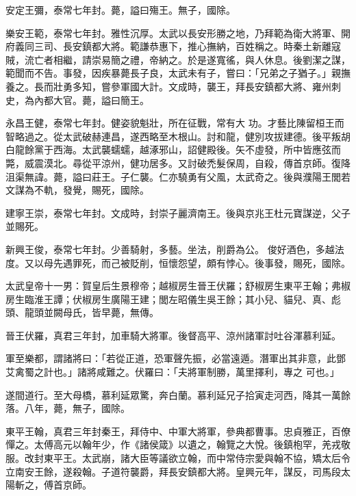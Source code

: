 \begin{pinyinscope}
 安定王彌，泰常七年封。薨，謚曰殤王。無子，國除。



 樂安王範，泰常七年封。雅性沉厚。太武以長安形勝之地，乃拜範為衛大將軍、開府義同三司、長安鎮都大將。範謙恭惠下，推心撫納，百姓稱之。時秦土新離寇賊，流亡者相繼，請崇易簡之禮，帝納之。於是遂寬徭，與人休息。後劉潔之謀，範聞而不告。事發，因疾暴薨長子良，太武未有子，嘗曰：「兄弟之子猶子。」親撫養之。長而壯勇多知，嘗參軍國大計。文成時，襲王，拜長安鎮都大將、雍州刺史，為內都大官。薨，謚曰簡王。



 永昌王健，泰常七年封。健姿貌魁壯，所在征戰，常有大
 功。才藝比陳留桓王而智略過之。從太武破赫連昌，遂西略至木根山。討和龍，健別攻拔建德。後平叛胡白龍餘黨于西海。太武襲蠕蠕，越涿邪山，詔健殿後。矢不虛發，所中皆應弦而斃，威震漠北。尋從平涼州，健功居多。又討破禿髮保周，自殺，傳首京師。復降沮渠無諱。薨，謚曰莊王。子仁襲。仁亦驍勇有父風，太武奇之。後與濮陽王閭若文謀為不軌，發覺，賜死，國除。



 建寧王崇，泰常七年封。文成時，封崇子麗濟南王。後與京兆王杜元寶謀逆，父子並賜死。



 新興王俊，泰常七年封。少善騎射，多藝。坐法，削爵為公。
 俊好酒色，多越法度。又以母先遇罪死，而己被貶削，恒懷怨望，頗有悖心。後事發，賜死，國除。



 太武皇帝十一男：賀皇后生景穆帝；越椒房生晉王伏羅；舒椒房生東平王翰；弗椒房生臨淮王譚；伏椒房生廣陽王建；閭左昭儀生吳王餘；其小兒、貓兒、真、彪頭、龍頭並闕母氏，皆早薨，無傳。



 晉王伏羅，真君三年封，加車騎大將軍。後督高平、涼州諸軍討吐谷渾慕利延。



 軍至樂都，謂諸將曰：「若從正道，恐軍聲先振，必當遠遁。潛軍出其非意，此鄧艾禽蜀之計也。」諸將咸難之。伏羅曰：「夫將軍制勝，萬里擇利，專之
 可也。」



 遂間道行。至大母橋，慕利延眾驚，奔白蘭。慕利延兄子拾寅走河西，降其一萬餘落。八年，薨，無子，國除。



 東平王翰，真君三年封秦王，拜侍中、中軍大將軍，參典都曹事。忠貞雅正，百僚憚之。太傅高元以翰年少，作《諸侯箴》以遺之，翰覽之大悅。後鎮枹罕，羌戎敬服。改封東平王。太武崩，諸大臣等議欲立翰，而中常侍宗愛與翰不協，矯太后令立南安王餘，遂殺翰。子道符襲爵，拜長安鎮都大將。皇興元年，謀反，司馬段太陽斬之，傅首京師。




\end{pinyinscope}
